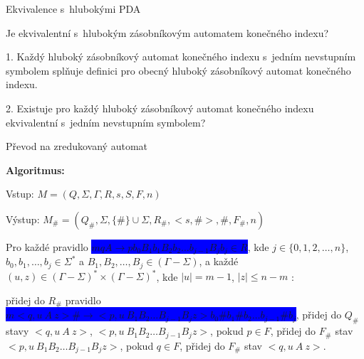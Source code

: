 \documentclass[a4paper,fyma3]{prosper}
\theoremstyle{definition}
\begin{document}
\begin{slide}{Ekvivalence s~hlubokými PDA}
\bigskip
\bigskip

Je ekvivalentní s~hlubokým zásobníkovým automatem konečného indexu?
\medskip

1. Každý hluboký zásobníkový automat konečného indexu s~jedním nevstupním symbolem splňuje definici pro obecný hluboký zásobníkový automat konečného indexu.
\medskip

2. Existuje pro každý hluboký zásobníkový automat konečného indexu ekvivalentní s~jedním nevstupním symbolem?

\end{slide}


\begin{slide}{Převod na zredukovaný automat}
\bigskip

\begin{list}{}{\setlength\parsep{0cm} \setlength\itemsep{0cm} \setlength\leftmargin{1em}}
  \item \textbf{Algoritmus:} \medskip
   \item Vstup: $M = (Q,\Sigma,\Gamma, R, s, S, F, n)$ 
   \item Výstup: $M_\# = (Q_\# ,{\Sigma},\{\#\} \cup \Sigma, R_\#, <s,\#>,  \#, F_\#, n)$ \medskip
  \item Pro každé pravidlo \colorbox{blue}{\black $mqA \rightarrow p b_0 B_1 b_1 B_2 b_2 \dots b_{j-1} B_{j} b_j \in R$}, kde $j \in \{0,1,2,\dots,n\}$, $b_0,b_1,\dots,b_j \in {\Sigma}^*$ a $B_1,B_2,\dots,B_j \in (\Gamma - \Sigma)$, 
 a každé $(u,z) \in (\Gamma - \Sigma)^* \times (\Gamma - \Sigma)^*$,  kde $|u|=m-1$, $|z|\le n-m$  : \medskip

  \subitem přidej do $R_\#$ pravidlo \colorbox{blue}{\black $m <q, u~A~z> \# \rightarrow <p, u~B_1 B_2 \dots B_{j-1} B_{j} z> b_0 \# b_1 \# b_2 \dots b_{j-1} \# b_j $}, \medskip
  \subitem přidej do $Q_\#$ stavy $<q, u~A~z>$, $<p, u~B_1 B_2 \dots B_{j-1} B_{j} z>$,
  \subitem pokud $p \in F$, přidej do $F_\#$ stav $<p, u~B_1 B_2 \dots B_{j-1} B_{j} z>$,
  \subitem pokud $q \in F$, přidej do $F_\#$ stav $<q, u~A~z>$.

\end{list}


\end{slide}
\end{document}
